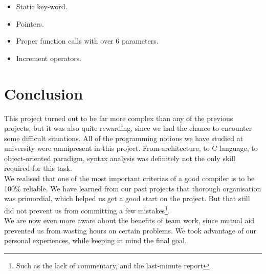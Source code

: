 \documentclass{scrartcl}
\begin{document}
\begin{itemize}
\item Static key-word.
\item Pointers.
\item Proper function calls with over 6 parameters.
\item Increment operators.
\end{itemize}

\section{Conclusion}
This project turned out to be far more complex than any of the previous projects, but it was also quite rewarding, since we had the chance to encounter some difficult situations. All of the programming notions we have studied at university were omnipresent in this project. From architecture, to C language, to object-oriented paradigm, syntax analysis was definitely not the only skill required for this task.\\

We realised that one of the most important criterias of a good compiler is to be 100\% reliable.
We have learned from our past projects that thorough organisation was primordial, which helped us get a good start on the project. But that still did not prevent us from committing a few mistakes\footnote{Such as the lack of commentary, and the last-minute report}.\\

We are now even more aware about the benefits of team work, since mutual aid prevented us from wasting hours on certain problems. We took advantage of our personal experiences, while keeping in mind the final goal.
\end{document}
